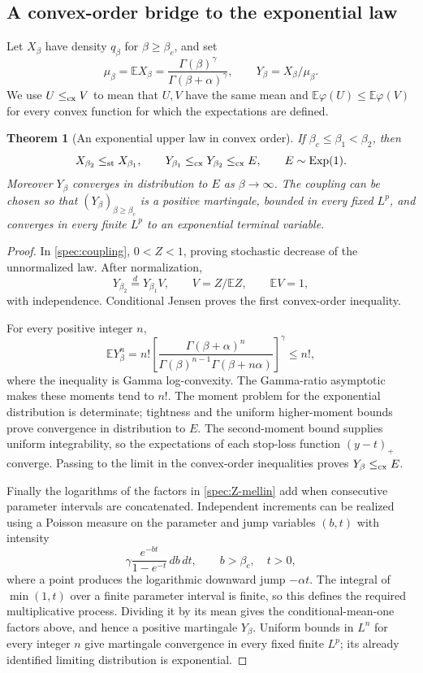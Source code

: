 \documentclass[11pt,a4paper]{article}
\newtheorem{theorem}{Theorem}[section]
\theoremstyle{definition}
\theoremstyle{remark}
\numberwithin{equation}{section}
\begin{document}
\subsection{A convex-order bridge to the exponential law}

Let \(X_\beta\) have density \(q_\beta\) for \(\beta\ge\beta_c\), and set
\[
 \mu_\beta=\mathbb E X_\beta
       =\frac{\Gamma(\beta)^\gamma}{\Gamma(\beta+\alpha)^\gamma},
 \qquad Y_\beta=X_\beta/\mu_\beta.
\]
We use \(U\le_{\rm cx}V\) to mean that \(U,V\) have the same mean and
\(\mathbb E\varphi(U)\le\mathbb E\varphi(V)\) for every convex function
for which the expectations are defined.

\begin{theorem}[An exponential upper law in convex order]
\label{spec:convex-order}
If \(\beta_c\le\beta_1<\beta_2\), then
\[
 X_{\beta_2}\le_{\rm st}X_{\beta_1},\qquad
 Y_{\beta_1}\le_{\rm cx}Y_{\beta_2}\le_{\rm cx}E,
 \qquad E\sim\operatorname{Exp}(1).
\]
Moreover \(Y_\beta\) converges in distribution to \(E\) as
\(\beta\to\infty\).  The coupling can be chosen so that
\((Y_\beta)_{\beta\ge\beta_c}\) is a positive martingale, bounded in
every fixed \(L^p\), and converges in every finite \(L^p\) to an
exponential terminal variable.
\end{theorem}

\begin{proof}
In \eqref{spec:coupling}, \(0<Z<1\), proving stochastic decrease of
the unnormalized law.  After normalization,
\[
 Y_{\beta_2}\overset d=Y_{\beta_1}V,
 \qquad V=Z/\mathbb E Z,\qquad \mathbb E V=1,
\]
with independence.  Conditional Jensen proves the first convex-order
inequality.

For every positive integer \(n\),
\[
 \mathbb E Y_\beta^n
 =n!\left[
   \frac{\Gamma(\beta+\alpha)^n}
        {\Gamma(\beta)^{n-1}\Gamma(\beta+n\alpha)}
       \right]^\gamma\le n!,
\]
where the inequality is Gamma log-convexity.  The Gamma-ratio
asymptotic makes these moments tend to \(n!\).  The moment problem
for the exponential distribution is determinate; tightness and the
uniform higher-moment bounds prove convergence in distribution to
\(E\).  The second-moment bound supplies uniform integrability,
so the expectations of each stop-loss function \((y-t)_+\) converge.
Passing to the limit in the convex-order inequalities proves
\(Y_\beta\le_{\rm cx}E\).

Finally the logarithms of the factors in \eqref{spec:Z-mellin}
add when consecutive parameter intervals are concatenated.  Independent
increments can be realized using a Poisson measure on the parameter and
jump variables \((b,t)\) with intensity
\[
 \gamma\frac{e^{-bt}}{1-e^{-t}}\,db\,dt,
 \qquad b>\beta_c,\quad t>0,
\]
where a point produces the logarithmic downward jump \(-\alpha t\).
The integral of \(\min(1,t)\) over a finite parameter interval is
finite, so this defines the required multiplicative process.
Dividing it by its mean gives the conditional-mean-one factors above,
and hence a positive martingale \(Y_\beta\).  Uniform bounds in
\(L^n\) for every integer \(n\) give martingale convergence in every
fixed finite \(L^p\); its already identified limiting distribution is
exponential.
\end{proof}
\end{document}
